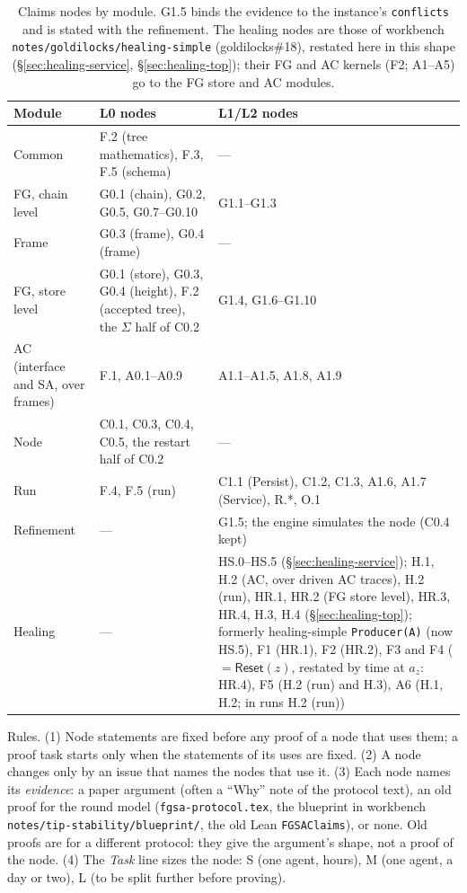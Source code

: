 \documentclass{article}
\begin{document}
\begin{table}[!ht]
\centering\footnotesize
\begin{tabular}{@{}>{\raggedright\arraybackslash}p{3.3cm}>{\raggedright\arraybackslash}p{5.2cm}>{\raggedright\arraybackslash}p{4.6cm}@{}}
\hline
Module & L0 nodes & L1/L2 nodes\\
\hline
Common & F.2 (tree mathematics), F.3, F.5 (schema) & ---\\
FG, chain level & G0.1 (chain), G0.2, G0.5, G0.7--G0.10 & G1.1--G1.3\\
Frame & G0.3 (frame), G0.4 (frame) & ---\\
FG, store level & G0.1 (store), G0.3, G0.4 (height), F.2 (accepted tree), the $\Sigma$ half of C0.2 & G1.4, G1.6--G1.10\\
AC (interface and SA, over frames) & F.1, A0.1--A0.9 & A1.1--A1.5, A1.8, A1.9\\
Node & C0.1, C0.3, C0.4, C0.5, the restart half of C0.2 & ---\\
Run & F.4, F.5 (run) & C1.1 (Persist), C1.2, C1.3, A1.6, A1.7 (Service), R.*, O.1\\
Refinement & --- & G1.5; the engine simulates the node (C0.4 kept)\\
Healing & --- & HS.0--HS.5 (\S\ref{sec:healing-service}); H.1, H.2 (AC, over driven AC traces), H.2 (run), HR.1, HR.2 (FG store level), HR.3, HR.4, H.3, H.4 (\S\ref{sec:healing-top}); formerly healing-simple \texttt{Producer(A)} (now HS.5), F1 (HR.1), F2 (HR.2), F3 and F4 ($=\mathsf{Reset}(z)$, restated by time at $a_z$: HR.4), F5 (H.2 (run) and H.3), A6 (H.1, H.2; in runs H.2 (run))\\
\hline
\end{tabular}
\caption{Claims nodes by module.  G1.5 binds the evidence to the instance's
\texttt{conflicts} and is stated with the refinement.  The healing nodes are
those of workbench \texttt{notes/goldilocks/healing-simple} (goldilocks\#18),
restated here in this shape (\S\ref{sec:healing-service},
\S\ref{sec:healing-top}); their FG and AC kernels (F2; A1--A5) go to the FG store
and AC modules.}
\label{tab:modules}
\end{table}
Rules.  (1) Node statements are fixed before any proof of a node that uses
them; a proof task starts only when the statements of its uses are fixed.
(2) A node changes only by an issue that names the nodes that use it.
(3) Each node names its \emph{evidence}: a paper argument (often a ``Why''
note of the protocol text), an old proof for the round model
(\texttt{fgsa-protocol.tex}, the blueprint in workbench
\texttt{notes/tip-stability/blueprint/}, the old Lean \texttt{FGSAClaims}), or
none.  Old proofs are for a different protocol: they give the argument's shape,
not a proof of the node.  (4) The \emph{Task} line sizes the node: S (one
agent, hours), M (one agent, a day or two), L (to be split further before
proving).
\end{document}
